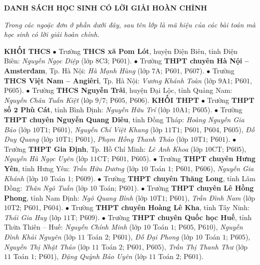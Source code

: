\begin{center}
	\textbf{\color{thachthuctoanhoc}DANH SÁCH HỌC SINH CÓ LỜI GIẢI HOÀN CHỈNH}
\end{center}
\textit{Trong các ngoặc đơn ở phần dưới đây, sau tên lớp là mã hiệu của các bài toán mà học sinh có lời giải hoàn chỉnh.}
\begin{multicols}{2}
	\textbf{\color{thachthuctoanhoc}KHỐI THCS}
	\vskip 0.05cm
	$\bullet$ Trường \textbf{\color{thachthuctoanhoc}THCS xã Pom Lót}, huyện Điện Biên, tỉnh Điện Biên: \textit{Nguyễn Ngọc Diệp} (lớp $8$C$3$; P$601$).
	\vskip 0.05cm
	$\bullet$ Trường \textbf{\color{thachthuctoanhoc}THPT chuyên Hà Nội -- Amsterđam}, Tp. Hà Nội: \textit{Hà Mạnh Hùng} (lớp $7$A; P$601$, P$607$).
	\vskip 0.05cm
	$\bullet$ Trường \textbf{\color{thachthuctoanhoc}THCS Việt Nam -- Angiêri}, Tp. Hà Nội: \textit{Vương Khánh Toàn} (lớp $9$A$1$; P$601$, P$605$).
	\vskip 0.05cm
	$\bullet$ Trường \textbf{\color{thachthuctoanhoc}THCS Nguyễn Trãi}, huyện Đại Lộc, tỉnh Quảng Nam: \textit{Nguyễn Châu Tuấn Kiệt} (lớp $9/7$; P$605$, P$606$).
	\vskip 0.05cm
	\textbf{\color{thachthuctoanhoc}KHỐI THPT}
	\vskip 0.05cm
	$\bullet$ Trường \textbf{\color{thachthuctoanhoc}THPT số $\pmb{2}$ Phù Cát}, tỉnh Bình Định: \textit{Nguyễn Hữu Trí} (lớp $10$A$1$; P$605$).
	\vskip 0.05cm
	$\bullet$ Trường \textbf{\color{thachthuctoanhoc}THPT chuyên Nguyễn Quang Diêu}, tỉnh Đồng Tháp: \textit{Hoàng Nguyễn Gia Bảo} (lớp $10$T$1$; P$601$), \textit{Nguyễn Chí Việt Khang} (lớp $11$T$1$; P$601$, P$604$, P$605$), \textit{Đỗ Duy Quang} (lớp $10$T$1$; P$601$), \textit{Phạm Hồng Thanh Thảo} (lớp $10$T$1$; P$601$).
	\vskip 0.05cm
	$\bullet$ Trường \textbf{\color{thachthuctoanhoc}THPT Gia Định}, Tp. Hồ Chí Minh: \textit{Lê Anh Khoa} (lớp $10$CT; P$605$), \textit{Nguyễn Hà Ngọc Uyên} (lớp $11$CT; P$601$, P$605$).
	\vskip 0.05cm
	$\bullet$ Trường \textbf{\color{thachthuctoanhoc}THPT chuyên Hưng Yên}, tỉnh Hưng Yên: \textit{Trần Hữu Dương} (lớp $10$ Toán $1$; P$601$, P$606$), \textit{Nguyễn Gia Khánh} (lớp $10$ Toán $1$; P$609$).
	\vskip 0.05cm
	$\bullet$ Trường \textbf{\color{thachthuctoanhoc}THPT chuyên Thăng Long}, tỉnh Lâm Đồng: \textit{Thân Ngô Tuấn} (lớp $10$ Toán; P$601$).
	\vskip 0.05cm
	$\bullet$ Trường \textbf{\color{thachthuctoanhoc}THPT chuyên Lê Hồng Phong}, tỉnh Nam Định: \textit{Ngô Quang Bình} (lớp $10$T$1$; P$601$), \textit{Trần Đình Nam} (lớp $10$T$2$; P$601$, P$604$).
	\vskip 0.05cm
	$\bullet$ Trường \textbf{\color{thachthuctoanhoc}THPT chuyên Hoàng Lê Kha}, tỉnh Tây Ninh: \textit{Thái Gia Huy} (lớp $11$T; P$609$).
	\vskip 0.05cm
	$\bullet$ Trường \textbf{\color{thachthuctoanhoc}THPT chuyên Quốc học Huế}, tỉnh Thừa Thiên -- Huế: \textit{Nguyễn Chính Minh} (lớp $10$ Toán $1$; P$605$, P$610$), \textit{Nguyễn Đình Khải Nguyên} (lớp $11$ Toán $2$; P$601$), \textit{Đỗ Đại Phong} (lớp $10$ Toán $1$; P$605$), \textit{Nguyễn Thị Nhật Thảo} (lớp $11$ Toán $2$; P$601$, P$605$), \textit{Trần Thị Thanh Thư} (lớp $11$ Toán $1$; P$601$), \textit{Đặng Quỳnh Bảo Uyên} (lớp $11$ Toán $2$; P$601$).

\end{multicols}
